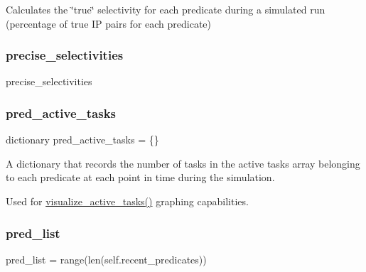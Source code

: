 Calculates the \char`\"{}true\char`\"{} selectivity for each predicate during a simulated run (percentage of true IP pairs for each predicate) 

\mbox{\label{classdynamicfilterapp_1_1test__simulations_1_1_simulation_test_ac31632c95ded6ca45f6cc4d9b7960dc5}} 
\subsubsection{\texorpdfstring{precise\_selectivities}{precise\_selectivities}\hspace{0.1cm}{\footnotesize\ttfamily [2/2]}}
{\footnotesize\ttfamily precise\+\_\+selectivities}

\mbox{\label{classdynamicfilterapp_1_1test__simulations_1_1_simulation_test_a99bc70b457bf163e498bda36817b9b4c}} 
\subsubsection{\texorpdfstring{pred\_active\_tasks}{pred\_active\_tasks}}
{\footnotesize\ttfamily dictionary pred\+\_\+active\+\_\+tasks = \{\}\hspace{0.3cm}{\ttfamily [static]}}



A dictionary that records the number of tasks in the active tasks array belonging to each predicate at each point in time during the simulation. 

Used for \mbox{\hyperlink{namespacedynamicfilterapp_1_1graph_gen_a6cbfcba30770fe88d3861ce90330a3a9}{visualize\+\_\+active\+\_\+tasks()}} graphing capabilities. \mbox{\label{classdynamicfilterapp_1_1test__simulations_1_1_simulation_test_a9ecbfebeaf51a31cbe46c8ce7814e330}} 
\subsubsection{\texorpdfstring{pred\_list}{pred\_list}}
{\footnotesize\ttfamily pred\+\_\+list = range(len(self.\+recent\+\_\+predicates))\hspace{0.3cm}{\ttfamily [static]}}

